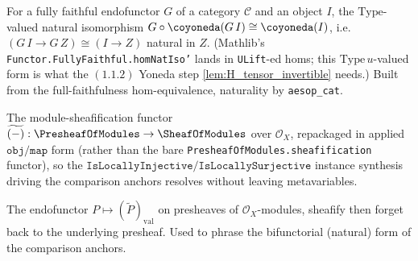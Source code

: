 
\begin{definition}

  \label{def:coyonedaCompFF}
  For a fully faithful endofunctor $G$ of a category $\mathcal{C}$ and an object $I$,
  the $\mathrm{Type}$-valued natural isomorphism
  $G \circ \coyoneda(G\,I) \cong \coyoneda(I)$, i.e. $(G\,I \to G\,Z) \cong (I \to Z)$
  natural in $Z$. (Mathlib's \texttt{Functor.FullyFaithful.homNatIso'} lands in
  \texttt{ULift}-ed homs; this $\mathrm{Type}\,u$-valued form is what the $(1.1.2)$
  Yoneda step \cref{lem:H_tensor_invertible} needs.) Built from the full-faithfulness
  hom-equivalence, naturality by \texttt{aesop\_cat}.
\end{definition}

\begin{definition}

  \label{def:moduleSheafification}
  The module-sheafification functor $\widetilde{(-)} : \PresheafOfModules \to
  \SheafOfModules$ over $\mathcal{O}_X$, repackaged in applied $\texttt{obj}/\texttt{map}$
  form (rather than the bare \texttt{PresheafOfModules.sheafification} functor), so the
  $\texttt{IsLocallyInjective}/\texttt{IsLocallySurjective}$ instance synthesis driving
  the comparison anchors resolves without leaving metavariables.
\end{definition}

\begin{definition}

  \label{def:sheafifyForget}
  The endofunctor $P \mapsto (\widetilde{P})_{\mathrm{val}}$ on presheaves of
  $\mathcal{O}_X$-modules, sheafify then forget back to the underlying presheaf. Used to
  phrase the bifunctorial (natural) form of the comparison anchors.
\end{definition}

